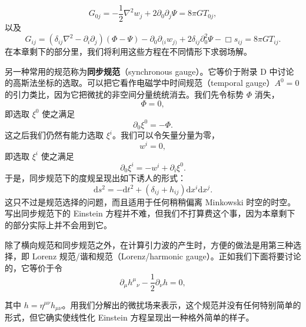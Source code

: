 \begin{equation*}
\boxed{\,G_{0j} = -\frac{1}{2}\nabla^{2}w_{j} + 2\partial_{0}\partial_{j}\Psi = 8\pi GT_{0j},\,}
\tag{7.39}
\end{equation*}
以及
\begin{equation*}
\boxed{\,G_{ij} = (\delta_{ij}\nabla^{2} - \partial_{i}\partial_{j})(\Phi - \Psi) - \partial_{0}\partial_{(i}w_{j)} + 2\delta_{ij}\partial_{0}^{2}\Psi - \Box s_{ij} = 8\pi GT_{ij}.\,}
\tag{7.40}
\end{equation*}
在本章剩下的部分里，我们将利用这些方程在不同情形下求弱场解。

另一种常用的规范称为\textbf{同步规范}（synchronous gauge）。它等价于附录 D 中讨论的高斯法坐标的选取。可以把它看作电磁学中时间规范（temporal gauge）$A^{0} = 0$ 的引力类比，因为它把微扰的非空间分量统统消去。我们先令标势 $\Phi$ 消失，
\begin{equation*}
\Phi = 0,
\tag{7.41}
\end{equation*}
即选取 $\xi^{0}$ 使之满足
\begin{equation*}
\partial_{0}\xi^{0} = -\Phi.
\tag{7.42}
\end{equation*}
这之后我们仍然有能力选取 $\xi^{i}$。我们可以令矢量分量为零，
\begin{equation*}
w^{i} = 0,
\tag{7.43}
\end{equation*}
即选取 $\xi^{i}$ 使之满足
\begin{equation*}
\partial_{0}\xi^{i} = -w^{i} + \partial_{i}\xi^{0}.
\tag{7.44}
\end{equation*}
于是，同步规范下的度规呈现出如下诱人的形式：
\begin{equation*}
\mathrm{d}s^{2} = -\mathrm{d}t^{2} + (\delta_{ij} + h_{ij})\mathrm{d}x^{i}\mathrm{d}x^{j}.
\tag{7.45}
\end{equation*}
这只不过是规范选择的问题，而且适用于任何稍稍偏离 Minkowski 时空的时空。写出同步规范下的 Einstein 方程并不难，但我们不打算费这个事，因为本章剩下的部分实际上并不会用到它。

除了横向规范和同步规范之外，在计算引力波的产生时，方便的做法是用第三种选择，即 Lorenz 规范/谐和规范（Lorenz/harmonic gauge）。正如我们下面将要讨论的，它等价于令
\begin{equation*}
\partial_{\mu}h^{\mu}{}_{\nu} - \frac{1}{2}\partial_{\nu}h = 0,
\tag{7.46}
\end{equation*}

其中 $h = \eta^{\mu\nu}h_{\mu\nu}$。用我们分解出的微扰场来表示，这个规范并没有任何特别简单的形式，但它确实使线性化 Einstein 方程呈现出一种格外简单的样子。

